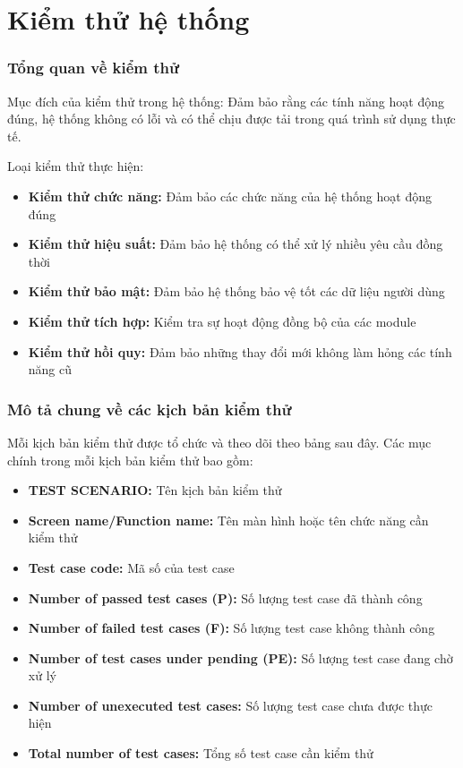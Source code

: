 \chapter{Kiểm thử hệ thống}
\subsection{Tổng quan về kiểm thử}

Mục đích của kiểm thử trong hệ thống: Đảm bảo rằng các tính năng hoạt động đúng, hệ thống không có lỗi và có thể chịu được tải trong quá trình sử dụng thực tế.

Loại kiểm thử thực hiện:
\begin{itemize}
	\item \textbf{Kiểm thử chức năng:} Đảm bảo các chức năng của hệ thống hoạt động đúng
	\item \textbf{Kiểm thử hiệu suất:} Đảm bảo hệ thống có thể xử lý nhiều yêu cầu đồng thời
	\item \textbf{Kiểm thử bảo mật:} Đảm bảo hệ thống bảo vệ tốt các dữ liệu người dùng
	\item \textbf{Kiểm thử tích hợp:} Kiểm tra sự hoạt động đồng bộ của các module
	\item \textbf{Kiểm thử hồi quy:} Đảm bảo những thay đổi mới không làm hỏng các tính năng cũ
\end{itemize}


\subsection{Mô tả chung về các kịch bản kiểm thử}

Mỗi kịch bản kiểm thử được tổ chức và theo dõi theo bảng sau đây. Các mục chính trong mỗi kịch bản kiểm thử bao gồm:
\begin{itemize}
	\item \textbf{TEST SCENARIO:} Tên kịch bản kiểm thử
	\item \textbf{Screen name/Function name:} Tên màn hình hoặc tên chức năng cần kiểm thử
	\item \textbf{Test case code:} Mã số của test case
	\item \textbf{Number of passed test cases (P):} Số lượng test case đã thành công
	\item \textbf{Number of failed test cases (F):} Số lượng test case không thành công
	\item \textbf{Number of test cases under pending (PE):} Số lượng test case đang chờ xử lý
	\item \textbf{Number of unexecuted test cases:} Số lượng test case chưa được thực hiện
	\item \textbf{Total number of test cases:} Tổng số test case cần kiểm thử
\end{itemize}

